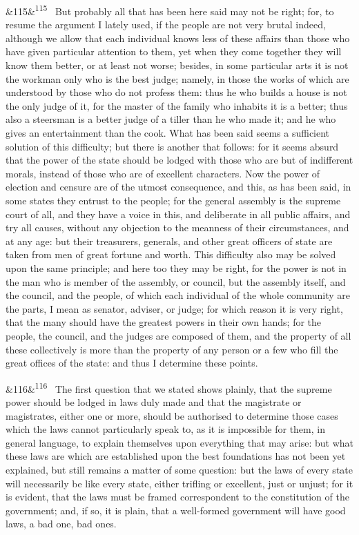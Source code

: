 \documentclass[12pt]{article}
\newcommand{\para}[1][]{\par\noindent\ifx&#1&\else\textsuperscript{\footnotesize #1}~\fi}
\begin{document}
\para[115] But probably all that has been here said may not be right; for, to resume the argument I lately used, if the people are not very brutal indeed, although we allow that each individual knows less of these affairs than those who have given particular attention to them, yet when they come together they will know them better, or at least not worse; besides, in some particular arts it is not the workman only who is the best judge; namely, in those the works of which are understood by those who do not profess them: thus he who builds a house is not the only judge of it, for the master of the family who inhabits it is a better; thus also a steersman is a better judge of a tiller than he who made it; and he who gives an entertainment than the cook. What has been said seems a sufficient solution of this difficulty; but there is another that follows: for it seems absurd that the power of the state should be lodged with those who are but of indifferent morals, instead of those who are of excellent characters. Now the power of election and censure are of the utmost consequence, and this, as has been said, in some states they entrust to the people; for the general assembly is the supreme court of all, and they have a voice in this, and deliberate in all public affairs, and try all causes, without any objection to the meanness of their circumstances, and at any age: but their treasurers, generals, and other great officers of state are taken from men of great fortune and worth. This difficulty also may be solved upon the same principle; and here too they may be right, for the power is not in the man who is member of the assembly, or council, but the assembly itself, and the council, and the people, of which each individual of the whole community are the parts, I mean as senator, adviser, or judge; for which reason it is very right, that the many should have the greatest powers in their own hands; for the people, the council, and the judges are composed of them, and the property of all these collectively is more than the property of any person or a few who fill the great offices of the state: and thus I determine these points.

\para[116] The first question that we stated shows plainly, that the supreme power should be lodged in laws duly made and that the magistrate or magistrates, either one or more, should be authorised to determine those cases which the laws cannot particularly speak to, as it is impossible for them, in general language, to explain themselves upon everything that may arise: but what these laws are which are established upon the best foundations has not been yet explained, but still remains a matter of some question: but the laws of every state will necessarily be like every state, either trifling or excellent, just or unjust; for it is evident, that the laws must be framed correspondent to the constitution of the government; and, if so, it is plain, that a well-formed government will have good laws, a bad one, bad ones.
\end{document}
